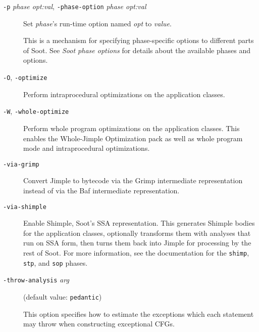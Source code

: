 \documentclass{article}
\begin{document}
\begin{description}

  \item[
  {\tt -p}{ \it phase opt:val}, 
  {\tt -phase-option}{ \it phase opt:val}]


\par

Set {\it phase}'s run-time option named {\it opt} to
{\it value}.

\par

This is a mechanism for specifying phase-specific options to
different parts of Soot. See {\it Soot phase options} for
details about the available phases and options.



  \item[
  {\tt -O}, 
  {\tt -optimize}]

Perform intraprocedural optimizations on the application classes.



  \item[
  {\tt -W}, 
  {\tt -whole-optimize}]

Perform whole program optimizations on the application
classes. This enables the Whole-Jimple Optimization pack as well
as whole program mode and intraprocedural optimizations.



  \item[
  {\tt -via-grimp}]

Convert Jimple to bytecode via the Grimp intermediate
representation instead of via the Baf intermediate
representation.



  \item[
  {\tt -via-shimple}]

Enable Shimple, Soot's SSA representation. This generates Shimple
bodies for the application classes, optionally transforms them
with analyses that run on SSA form, then turns them back into
Jimple for processing by the rest of Soot. For more information,
see the documentation for the {\tt shimp}, {\tt stp}, and
{\tt sop} phases.



  \item[
  {\tt -throw-analysis}{ \it arg}]

(default value: {\tt pedantic})

This option specifies how to estimate the exceptions which each statement
may throw when constructing exceptional CFGs.
        




\end{description}
\end{document}
